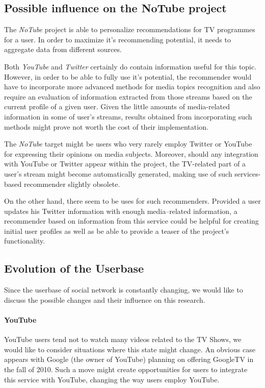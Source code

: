 \subsection{Possible influence on the NoTube project}

The \textit{NoTube} project is able to personalize recommendations for TV programmes for a user. In order to maximize
it's recommending potential, it needs to aggregate data from different sources.

Both \textit{YouTube} and \textit{Twitter} certainly do contain information useful for this topic. However, in order to be
able to fully use it's potential, the recommender would have to incorporate more advanced methods for media topics
recognition and also require an evaluation of information extracted from those streams based on the current profile
of a given user. Given the little amounts of media-related information in some of user's streams, results obtained from incorporating such methods might prove not worth the cost of their implementation.

The \textit{NoTube} target might be users who very rarely employ Twitter or YouTube for expressing their
opinions on media subjects. Moreover, should any integration with YouTube or Twitter appear within the project, the TV-related
part of a user's stream might become automatically generated, making use of such services-based recommender slightly obsolete.

On the other hand, there seem to be uses for such recommenders. Provided a user updates his Twitter information with enough
media--related information, a recommender based on information from this service could be helpful for creating initial
user profiles as well as be able to provide a teaser of the project's functionality.

\subsection{Evolution of the Userbase}
Since the userbase of social network is constantly changing, we would like to discuss the possible changes and their
influence on this research.

\paragraph{YouTube}
YouTube users tend not to watch many videos related to the TV Shows, we would like to consider situations where this
state might change. An obvious case appears with Google (the owner of YouTube) planning on offering GoogleTV in the fall
of 2010. Such a move might create opportunities for users to integrate this service with YouTube, changing the way
users employ YouTube.

